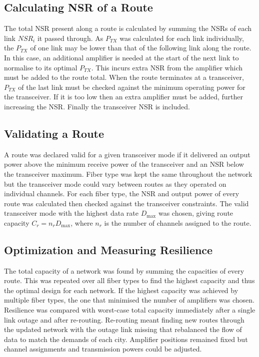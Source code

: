 \documentclass[12pt,a4paper]{article}
\begin{document}
\subsection{Calculating NSR of a Route}
The total NSR present along a route is calculated by summing the NSRs of each link \(NSR_i\) it passed through. As \(P_{TX}\) was calculated for each link individually, the \(P_{TX}\) of one link may be lower than that of the following link along the route. In this case, an additional amplifier is needed at the start of the next link to normalise to its optimal \(P_{TX}\). This incurs extra NSR from the amplifier which must be added to the route total. When the route terminates at a transceiver, \(P_{TX}\) of the last link must be checked against the minimum operating power for the transceiver. If it is too low then an extra amplifier must be added, further increasing the NSR. Finally the transceiver NSR is included.
\subsection{Validating a Route}
A route was declared valid for a given transceiver mode if it delivered an output power above the minimum receive power of the transceiver and an NSR below the transceiver maximum. Fiber type was kept the same throughout the network but the transceiver mode could vary between routes as they operated on individual channels. For each fiber type, the NSR and output power of every route was calculated then checked against the transceiver constraints. The valid transceiver mode with the highest data rate \(D_{\max}\) was chosen, giving route capacity \(C_r = n_r D_{\max}\), where \(n_r\) is the number of channels assigned to the route.
\subsection{Optimization and Measuring Resilience}
The total capacity of a network was found by summing the capacities of every route. This was repeated over all fiber types to find the highest capacity and thus the optimal design for each network. If the highest capacity was achieved by multiple fiber types, the one that minimised the number of amplifiers was chosen. Resilience was compared with worst-case total capacity immediately after a single link outage and after re-routing. Re-routing meant finding new routes through the updated network with the outage link missing that rebalanced the flow of data to match the demands of each city. Amplifier positions remained fixed but channel assignments and transmission powers could be adjusted.
\end{document}
